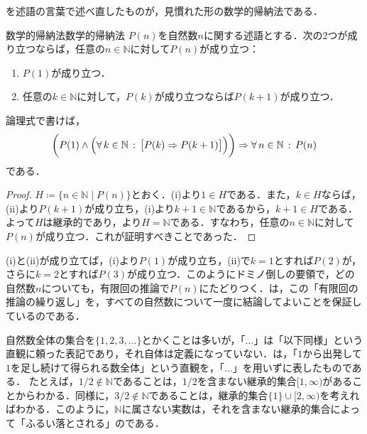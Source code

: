 を述語の言葉で述べ直したものが，見慣れた形の数学的帰納法である．

\begin{cor}{数学的帰納法}{数学的帰納法}
  $P(n)$を自然数$n$に関する述語とする．次の$2$つが成り立つならば，任意の$n \in \mathbb{N}$に対して$P(n)$が成り立つ：
  \begin{enumerate}[label=(\roman*),leftmargin=3.2em]
    \item $P(1)$が成り立つ．
    \item 任意の$k \in \mathbb{N}$に対して，$P(k)$が成り立つならば$P(k+1)$が成り立つ．
  \end{enumerate}
  論理式で書けば，
  \[
    \biggl( P(1) \land \Bigl( \forall\, k \in \mathbb{N} \,:\, \bigl[ P(k) \mathrel{\Rightarrow} P(k+1) \bigr] \Bigr) \biggr)
    \mathrel{\Rightarrow}
    \forall\, n \in \mathbb{N} \,:\, P(n)
  \]
  である．
\end{cor}

\begin{tleftbar}
  \begin{proof}
    $H \coloneqq \{ n \in \mathbb{N} \mid P(n) \}$とおく．(i)より$1 \in H$である．また，$k \in H$ならば，(ii)より$P(k+1)$が成り立ち，(i)より$k + 1 \in \mathbb{N}$であるから，$k + 1 \in H$である．よって$H$は継承的であり，より$H = \mathbb{N}$である．すなわち，任意の$n \in \mathbb{N}$に対して$P(n)$が成り立つ．これが証明すべきことであった．
  \end{proof}
\end{tleftbar}

(i)と(ii)が成り立てば，(i)より$P(1)$が成り立ち，(ii)で$k = 1$とすれば$P(2)$が，さらに$k = 2$とすれば$P(3)$が成り立つ．このようにドミノ倒しの要領で，どの自然数$n$についても，有限回の推論で$P(n)$にたどりつく．は，この「有限回の推論の繰り返し」を，すべての自然数について一度に結論してよいことを保証しているのである．

\begin{remark}[$\mathbb{N} = \{1, 2, 3, \ldots\}$との関係]
  自然数全体の集合を$\{1, 2, 3, \ldots\}$とかくことは多いが，「$\ldots$」は「以下同様」という直観に頼った表記であり，それ自体は定義になっていない．は，「$1$から出発して$1$を足し続けて得られる数全体」という直観を，「$\ldots$」を用いずに表したものである．
  たとえば，$1/2 \notin \mathbb{N}$であることは，$1/2$を含まない継承的集合$[1, \infty)$があることからわかる．同様に，$3/2 \notin \mathbb{N}$であることは，継承的集合$\{1\} \cup [2, \infty)$を考えればわかる．このように，$\mathbb{N}$に属さない実数は，それを含まない継承的集合によって「ふるい落とされる」のである．
\end{remark}

